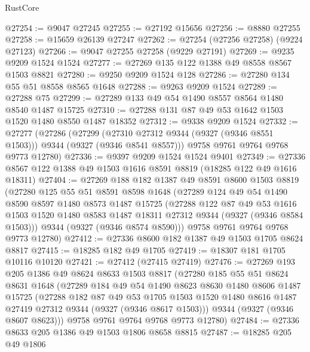 \begin{lexlean}{RustCore}
\begin{coremodule}
@27254 := @9047 @27245
@27255 := @27192 @15656
@27256 := @8880 @27255
@27258 := @15659 @26139 @27247
@27262 := @27254 (@27256 @27258) (@9224 @27123)
@27266 := @9047 @27255 @27258 (@9229 @27191)
@27269 := @9235 @9209 @1524 @1524
@27277 := @27269 @135 @122 @1388 @49 @8558 @8567 @1503 @8821
@27280 := @9250 @9209 @1524 @128
@27286 := @27280 @134 @55 @51 @8558 @8565 @1648
@27288 := @9263 @9209 @1524
@27289 := @27288 @75
@27299 := @27289 @133 @49 @54 @1490 @8557 @8564 @1480 @8540 @1487 @15725
@27310 := @27288 @131 @87 @49 @53 @1642 @1503 @1520 @1480 @8550 @1487 @18352
@27312 := @9338 @9209 @1524
@27332 := @27277
    (@27286
      (@27299 (@27310 @27312 @9344 (@9327 (@9346 @8551 @1503))) @9344 (@9327 (@9346 @8541 @8557)))
      @9758
      @9761
      @9764
      @9768
      @9773
      @12780)
@27336 := @9397 @9209 @1524 @1524 @9401
@27349 := @27336 @8567 @122 @1388 @49 @1503 @1616 @8591 @8819 (@18285 @122 @49 @1616 @18311)
@27404 := @27269
    @188
    @182
    @1387
    @49
    @8591
    @8600
    @1503
    @8819
    (@27280
      @125
      @55
      @51
      @8591
      @8598
      @1648
      (@27289
        @124
        @49
        @54
        @1490
        @8590
        @8597
        @1480
        @8573
        @1487
        @15725
        (@27288
          @122
          @87
          @49
          @53
          @1616
          @1503
          @1520
          @1480
          @8583
          @1487
          @18311
          @27312
          @9344
          (@9327 (@9346 @8584 @1503)))
        @9344
        (@9327 (@9346 @8574 @8590)))
      @9758
      @9761
      @9764
      @9768
      @9773
      @12780)
@27412 := @27336 @8600 @182 @1387 @49 @1503 @1705 @8624 @8817
@27415 := @18285 @182 @49 @1705
@27419 := @18307 @181 @1705 @10116 @10120
@27421 := @27412 (@27415 @27419)
@27476 := @27269
    @193
    @205
    @1386
    @49
    @8624
    @8633
    @1503
    @8817
    (@27280
      @185
      @55
      @51
      @8624
      @8631
      @1648
      (@27289
        @184
        @49
        @54
        @1490
        @8623
        @8630
        @1480
        @8606
        @1487
        @15725
        (@27288
          @182
          @87
          @49
          @53
          @1705
          @1503
          @1520
          @1480
          @8616
          @1487
          @27419
          @27312
          @9344
          (@9327 (@9346 @8617 @1503)))
        @9344
        (@9327 (@9346 @8607 @8623)))
      @9758
      @9761
      @9764
      @9768
      @9773
      @12780)
@27484 := @27336 @8633 @205 @1386 @49 @1503 @1806 @8658 @8815
@27487 := @18285 @205 @49 @1806

\end{coremodule}
\end{lexlean}
